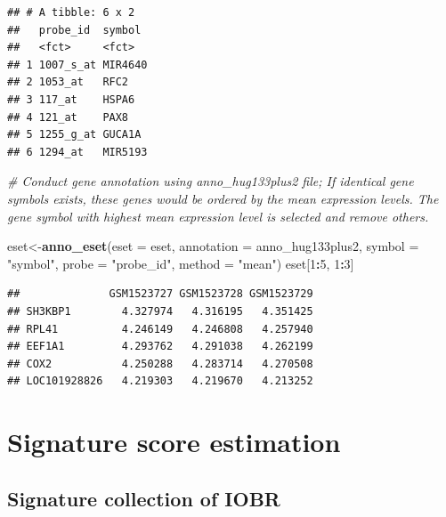 \documentclass[
  12pt,
]{book}
\newenvironment{Shaded}{\begin{snugshade}}{\end{snugshade}}
\newcommand{\AttributeTok}[1]{\textcolor[rgb]{0.13,0.29,0.53}{#1}}
\newcommand{\CommentTok}[1]{\textcolor[rgb]{0.56,0.35,0.01}{\textit{#1}}}
\newcommand{\DecValTok}[1]{\textcolor[rgb]{0.00,0.00,0.81}{#1}}
\newcommand{\FunctionTok}[1]{\textcolor[rgb]{0.13,0.29,0.53}{\textbf{#1}}}
\newcommand{\NormalTok}[1]{#1}
\newcommand{\OtherTok}[1]{\textcolor[rgb]{0.56,0.35,0.01}{#1}}
\newcommand{\SpecialCharTok}[1]{\textcolor[rgb]{0.81,0.36,0.00}{\textbf{#1}}}
\newcommand{\StringTok}[1]{\textcolor[rgb]{0.31,0.60,0.02}{#1}}
\begin{document}
\begin{verbatim}
## # A tibble: 6 x 2
##   probe_id  symbol 
##   <fct>     <fct>  
## 1 1007_s_at MIR4640
## 2 1053_at   RFC2   
## 3 117_at    HSPA6  
## 4 121_at    PAX8   
## 5 1255_g_at GUCA1A 
## 6 1294_at   MIR5193
\end{verbatim}

\begin{Shaded}
\begin{Highlighting}[]
\CommentTok{\# Conduct gene annotation using \textasciigrave{}anno\_hug133plus2\textasciigrave{} file; If identical gene symbols exists, these genes would be ordered by the mean expression levels. The gene symbol with highest mean expression level is selected and remove others. }

\NormalTok{eset}\OtherTok{\textless{}{-}}\FunctionTok{anno\_eset}\NormalTok{(}\AttributeTok{eset       =}\NormalTok{ eset,}
                \AttributeTok{annotation =}\NormalTok{ anno\_hug133plus2,}
                \AttributeTok{symbol     =} \StringTok{"symbol"}\NormalTok{,}
                \AttributeTok{probe      =} \StringTok{"probe\_id"}\NormalTok{,}
                \AttributeTok{method     =} \StringTok{"mean"}\NormalTok{)}
\NormalTok{eset[}\DecValTok{1}\SpecialCharTok{:}\DecValTok{5}\NormalTok{, }\DecValTok{1}\SpecialCharTok{:}\DecValTok{3}\NormalTok{]}
\end{Highlighting}
\end{Shaded}

\begin{verbatim}
##              GSM1523727 GSM1523728 GSM1523729
## SH3KBP1        4.327974   4.316195   4.351425
## RPL41          4.246149   4.246808   4.257940
## EEF1A1         4.293762   4.291038   4.262199
## COX2           4.250288   4.283714   4.270508
## LOC101928826   4.219303   4.219670   4.213252
\end{verbatim}

\hypertarget{signature-score-estimation}{%
\section{Signature score estimation}\label{signature-score-estimation}}

\hypertarget{signature-collection-of-iobr}{%
\subsection{Signature collection of IOBR}\label{signature-collection-of-iobr}}
\end{document}
